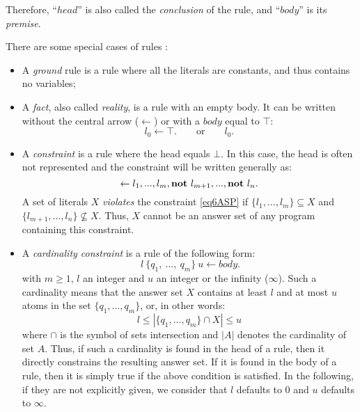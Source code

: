 \begin{enumerate}
Therefore, “$head$” is also called the \emph{conclusion} of the rule,
and “$body$” is its \emph{premise}.

There are some special cases of rules \cite{Vladimir,baral2003knowledge}:
\begin{itemize}
\item A \emph{ground} rule is a rule where all the literals are constants,
  and thus contains no variables;

\item A \emph{fact}, also called \emph{reality}, is a rule with an empty body.
  It can be written without the central arrow ($\leftarrow$) or with a $body$ equal to $\top$:
\begin{equation} 
l_{0} \leftarrow \top. \qquad \text{or} \qquad l_{0}.
 \label{eq5ASP}
\end{equation}

\item A \emph{constraint} is a rule where the head equals $\bot$.
  In this case, the head is often not represented and the constraint will be written generally as:
\begin{equation} 
  \leftarrow l_{1},...,l_{m}, \textbf{not}~ l_{m+1},..., \textbf{not}~ l_{n}.
  \label{eq6ASP}
\end{equation}
A set of literals $X$ \emph{violates} the constraint \eqref{eq6ASP} if $\{l_{1},...,l_{m}\} \subseteq X$ and $\{l_{m+1},...,l_{n}\} \nsubseteq X$.
Thus, $X$ cannot be an answer set of any program containing this constraint.

\item A \emph{cardinality constraint} is a rule of the following form:
\begin{equation} 
 ~ l ~\{q_{1},~ ... ,~ q_{m}\}~ u \leftarrow body.
 \label{eq7ASP}
\end{equation}
with $m \geq 1$, $l$ an integer and $u$ an integer or the infinity ($\infty$).
Such a cardinality means that the answer set $X$ contains
at least $l$ and at most $u$ atoms in the set $\{q_{1}, ... , q_{m}\}$,
or, in other words:
\begin{equation}
  l \leq | \{q_{1},... , q_{m}\} \cap X | \leq u
\end{equation}
where $\cap$ is the symbol of sets intersection
and $|A|$ denotes the cardinality of set $A$.
Thus, if such a cardinality is found in the head of a rule,
then it directly constrains the resulting answer set.
If it is found in the body of a rule,
then it is simply true if the above condition is satisfied.
In the following, if they are not explicitly given,
we consider that $l$ defaults to $0$ and $u$ defaults to $\infty$.

\end{itemize}


\end{enumerate}

